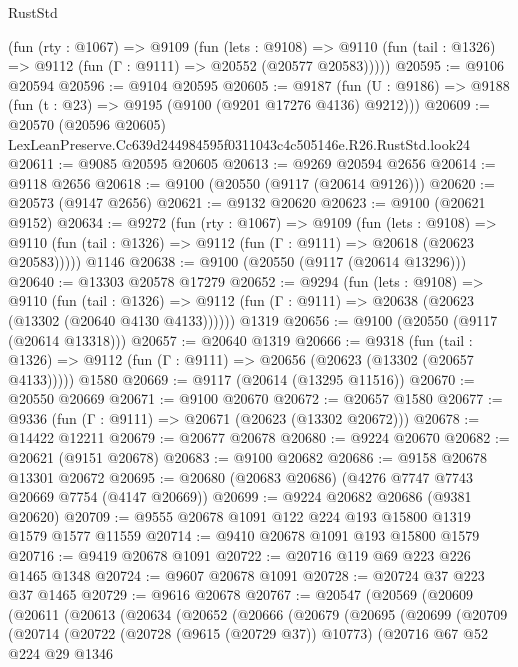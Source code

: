 \begin{lexlean}{RustStd}
\begin{coremodule}
    (fun (rty : @1067) =>
    @9109
      (fun (lets : @9108) =>
      @9110 (fun (tail : @1326) => @9112 (fun (Γ : @9111) => @20552 (@20577 @20583)))))
@20595 := @9106 @20594
@20596 := @9104 @20595
@20605 := @9187
    (fun (U : @9186) => @9188 (fun (t : @23) => @9195 (@9100 (@9201 @17276 @4136) @9212)))
@20609 := @20570
    (@20596 @20605)
    LexLeanPreserve.Cc639d244984595f0311043c4c505146e.R26.RustStd.look24
@20611 := @9085 @20595 @20605
@20613 := @9269 @20594 @2656
@20614 := @9118 @2656
@20618 := @9100 (@20550 (@9117 (@20614 @9126)))
@20620 := @20573 (@9147 @2656)
@20621 := @9132 @20620
@20623 := @9100 (@20621 @9152)
@20634 := @9272
    (fun (rty : @1067) =>
    @9109
      (fun (lets : @9108) =>
      @9110 (fun (tail : @1326) => @9112 (fun (Γ : @9111) => @20618 (@20623 @20583)))))
    @1146
@20638 := @9100 (@20550 (@9117 (@20614 @13296)))
@20640 := @13303 @20578 @17279
@20652 := @9294
    (fun (lets : @9108) =>
    @9110
      (fun (tail : @1326) =>
      @9112 (fun (Γ : @9111) => @20638 (@20623 (@13302 (@20640 @4130 @4133))))))
    @1319
@20656 := @9100 (@20550 (@9117 (@20614 @13318)))
@20657 := @20640 @1319
@20666 := @9318
    (fun (tail : @1326) => @9112 (fun (Γ : @9111) => @20656 (@20623 (@13302 (@20657 @4133)))))
    @1580
@20669 := @9117 (@20614 (@13295 @11516))
@20670 := @20550 @20669
@20671 := @9100 @20670
@20672 := @20657 @1580
@20677 := @9336 (fun (Γ : @9111) => @20671 (@20623 (@13302 @20672)))
@20678 := @14422 @12211
@20679 := @20677 @20678
@20680 := @9224 @20670
@20682 := @20621 (@9151 @20678)
@20683 := @9100 @20682
@20686 := @9158 @20678 @13301 @20672
@20695 := @20680 (@20683 @20686) (@4276 @7747 @7743 @20669 @7754 (@4147 @20669))
@20699 := @9224 @20682 @20686 (@9381 @20620)
@20709 := @9555 @20678 @1091 @122 @224 @193 @15800 @1319 @1579 @1577 @11559
@20714 := @9410 @20678 @1091 @193 @15800 @1579
@20716 := @9419 @20678 @1091
@20722 := @20716 @119 @69 @223 @226 @1465 @1348
@20724 := @9607 @20678 @1091
@20728 := @20724 @37 @223 @37 @1465
@20729 := @9616 @20678
@20767 := @20547
    (@20569
      (@20609
        (@20611
          (@20613
            (@20634
              (@20652
                (@20666
                  (@20679
                    (@20695
                      (@20699
                        (@20709
                          (@20714
                            (@20722
                              (@20728 (@9615 (@20729 @37)) @10773)
                              (@20716
                                @67
                                @52
                                @224
                                @29
                                @1346

\end{coremodule}
\end{lexlean}
